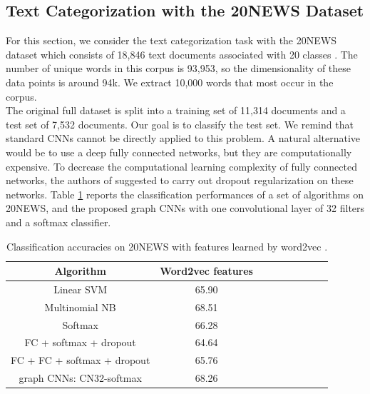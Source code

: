 \documentclass{article}
\begin{document}
\subsection{Text Categorization with the 20NEWS Dataset}
\vspace{-0.2cm}
For this section, we consider the text categorization task with the 20NEWS dataset which consists of 18,846 text documents associated with 20 classes \cite{art:Joachims9620NEWS}. The number of unique words in this corpus is 93,953, so the dimensionality of these data points is around 94k. We extract 10,000 words that most occur in the corpus.\\
The original full dataset is split into a training set of 11,314 documents and a test set of 7,532 documents. Our goal is to classify the test set. We remind that standard CNNs cannot be directly applied to this problem. A natural alternative would be to use a deep fully connected networks, but they are computationally expensive. To decrease the computational learning complexity of fully connected networks, the authors of \cite{art:HenaffBrunaLeCun15DLgraphs} suggested to carry out dropout regularization \cite{art:SrivastavaHintonKrizhevskySutskeverSalakhutdinov14dropout} on these networks. Table \ref{tab4a} reports the classification performances of a set of algorithms on 20NEWS, and the proposed graph CNNs with one convolutional layer of 32 filters and a softmax classifier.



\begin{table}[h!]
 \centering
{\small
\begin{tabular}{|c|c|c|c|c|c|c|c|c|}
\hline
 Algorithm & Word2vec features  \\
\hline
Linear SVM & 65.90  \\
Multinomial NB & 68.51 \\
Softmax & 66.28 \\
FC + softmax + dropout & 64.64 \\
FC + FC + softmax + dropout & 65.76 \\
graph CNNs: CN32-softmax & 68.26 \\
\hline
\end{tabular}
}
\caption{Classification accuracies on 20NEWS with features learned by word2vec \cite{pro:MikolovChenCorradoDean13word2vec}.} 
\label{tab4a}
\end{table}
\end{document}
